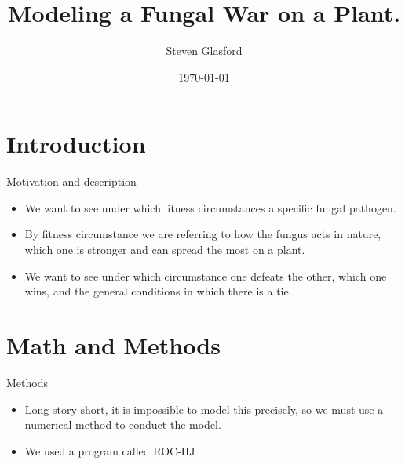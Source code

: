 \documentclass{beamer}
\author{Steven Glasford}
\title{Modeling a Fungal War on a Plant.}
\date{\today}
\begin{document}
\begin{frame}
\maketitle
\end{frame}



\section{Introduction}
\begin{frame}{Motivation and description}
    \begin{itemize}
        \item We want to see under which fitness circumstances a specific fungal pathogen. 
        \item By fitness circumstance we are referring to how the fungus acts in nature, which one is stronger and can spread the most on a plant.
        \item We want to see under which circumstance one defeats the other, which one wins, and the general conditions in which there is a tie.
    \end{itemize}
\end{frame}

\section{Math and Methods}
\begin{frame}{Methods}
\begin{itemize}
    \item Long story short, it is impossible to model this precisely, so we must use a numerical method to conduct the model.
    \item We used a program called ROC-HJ
\end{itemize}
\end{frame}
\end{document}
